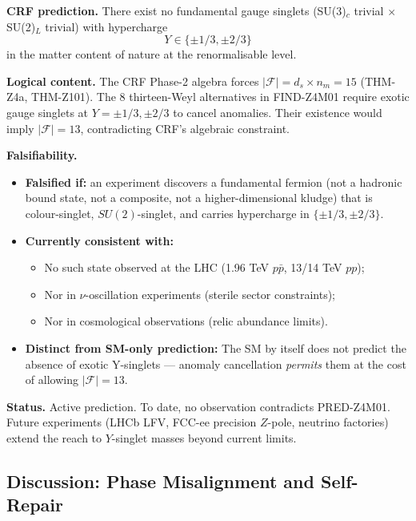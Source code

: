\documentclass[12pt, a4paper]{article}
\begin{document}
\begin{keybox}[title={PRED-Z4M01: No exotic Y-singlets (falsifiable CRF prediction; NEW v17.5)}]
\textbf{CRF prediction.} There exist no fundamental gauge singlets
(SU(3)$_c$ trivial $\times$ SU(2)$_L$ trivial) with hypercharge
\begin{equation*}
  Y \in \{\pm 1/3, \pm 2/3\}
\end{equation*}
in the matter content of nature at the renormalisable level.

\textbf{Logical content.} The CRF Phase-2 algebra forces
$|\mathcal{F}| = d_s \times n_m = 15$ (THM-Z4a, THM-Z101). The 8
thirteen-Weyl alternatives in FIND-Z4M01 require exotic gauge
singlets at $Y = \pm 1/3, \pm 2/3$ to cancel anomalies. Their
existence would imply $|\mathcal{F}| = 13$, contradicting CRF's
algebraic constraint.

\textbf{Falsifiability.}
\begin{itemize}[leftmargin=*, noitemsep]
  \item \textbf{Falsified if:} an experiment discovers a fundamental
    fermion (not a hadronic bound state, not a composite, not a
    higher-dimensional kludge) that is colour-singlet, $SU(2)$-singlet,
    and carries hypercharge in $\{\pm 1/3, \pm 2/3\}$.
  \item \textbf{Currently consistent with:}
    \begin{itemize}[noitemsep]
      \item No such state observed at the LHC (1.96 TeV $p\bar p$,
        13/14 TeV $pp$);
      \item Nor in $\nu$-oscillation experiments (sterile sector
        constraints);
      \item Nor in cosmological observations (relic abundance limits).
    \end{itemize}
  \item \textbf{Distinct from SM-only prediction:} The SM by itself
    does not predict the absence of exotic Y-singlets — anomaly
    cancellation \emph{permits} them at the cost of allowing
    $|\mathcal{F}| = 13$.
\end{itemize}

\textbf{Status.} Active prediction. To date, no observation
contradicts PRED-Z4M01. Future experiments (LHCb LFV, FCC-ee precision
$Z$-pole, neutrino factories) extend the reach to $Y$-singlet masses
beyond current limits.
\end{keybox}

\subsection{Discussion: Phase Misalignment and Self-Repair}
\end{document}
